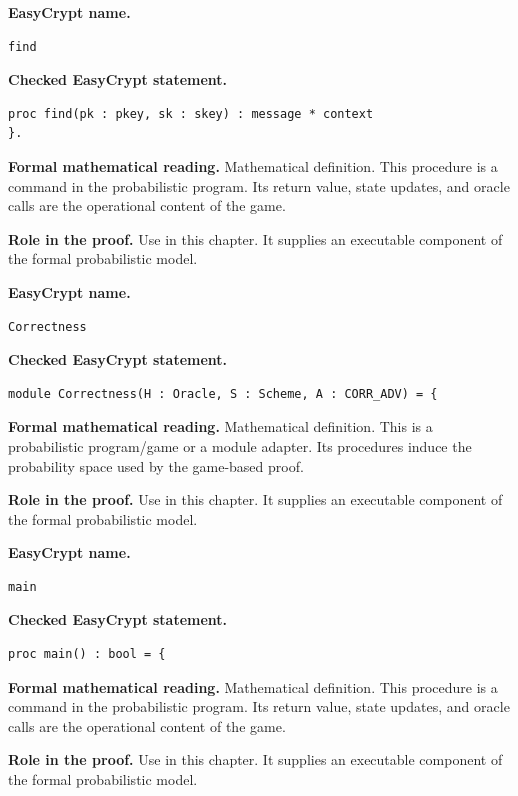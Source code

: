 \begin{formaldefinition}
\noindent\textbf{EasyCrypt name.}
\begin{lstlisting}[language=EasyCrypt,basicstyle=\ttfamily\scriptsize]
find
\end{lstlisting}
\noindent\textbf{Checked EasyCrypt statement.}
\begin{lstlisting}[language=EasyCrypt,basicstyle=\ttfamily\scriptsize]
proc find(pk : pkey, sk : skey) : message * context
}.
\end{lstlisting}
\noindent\textbf{Formal mathematical reading.}
Mathematical definition. This procedure is a command in the probabilistic program.  Its return value, state updates, and oracle calls are the operational content of the game.

\noindent\textbf{Role in the proof.}
Use in this chapter. It supplies an executable component of the formal probabilistic model.

\end{formaldefinition}

\begin{formaldefinition}
\noindent\textbf{EasyCrypt name.}
\begin{lstlisting}[language=EasyCrypt,basicstyle=\ttfamily\scriptsize]
Correctness
\end{lstlisting}
\noindent\textbf{Checked EasyCrypt statement.}
\begin{lstlisting}[language=EasyCrypt,basicstyle=\ttfamily\scriptsize]
module Correctness(H : Oracle, S : Scheme, A : CORR_ADV) = {
\end{lstlisting}
\noindent\textbf{Formal mathematical reading.}
Mathematical definition. This is a probabilistic program/game or a module adapter.  Its procedures induce the probability space used by the game-based proof.

\noindent\textbf{Role in the proof.}
Use in this chapter. It supplies an executable component of the formal probabilistic model.

\end{formaldefinition}

\begin{formaldefinition}
\noindent\textbf{EasyCrypt name.}
\begin{lstlisting}[language=EasyCrypt,basicstyle=\ttfamily\scriptsize]
main
\end{lstlisting}
\noindent\textbf{Checked EasyCrypt statement.}
\begin{lstlisting}[language=EasyCrypt,basicstyle=\ttfamily\scriptsize]
proc main() : bool = {
\end{lstlisting}
\noindent\textbf{Formal mathematical reading.}
Mathematical definition. This procedure is a command in the probabilistic program.  Its return value, state updates, and oracle calls are the operational content of the game.

\noindent\textbf{Role in the proof.}
Use in this chapter. It supplies an executable component of the formal probabilistic model.

\end{formaldefinition}

